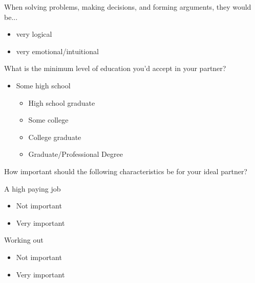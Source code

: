 \begin{multicols}{2}
 When solving problems, making decisions, and forming arguments, they would be...

 \begin{itemize}
  \item
        very logical
 \end{itemize}

 \begin{itemize}
  \item
        very emotional/intuitional
 \end{itemize}

 What is the minimum level of education you'd accept in your partner?

 \begin{itemize}
  \item
        Some high school

        \begin{itemize}
         \item
               High school graduate
        \end{itemize}

        \begin{itemize}
         \item
               Some college
         \item
               College graduate
         \item
               Graduate/Professional Degree
        \end{itemize}
 \end{itemize}

 How important should the following characteristics be for your ideal partner?

 A high paying job

 \begin{itemize}
  \item
        Not important
 \end{itemize}

 \begin{itemize}
  \item
        Very important
 \end{itemize}

 Working out

 \begin{itemize}
  \item
        Not important
 \end{itemize}

 \begin{itemize}
  \item
        Very important
 \end{itemize}


\end{multicols}

